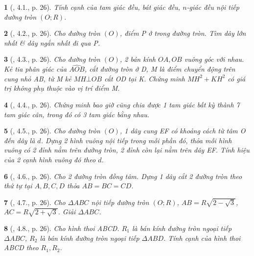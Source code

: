 \documentclass{article}
\newtheorem{baitoan}{}
\begin{document}
\begin{baitoan}[\cite{TLCT_THCS_Toan_9_hinh_hoc}, 4.1., p. 26]
	Tính cạnh của tam giác đều, bát giác đều, $n$-giác đều nội tiếp đường tròn $(O;R)$.
\end{baitoan}

\begin{baitoan}[\cite{TLCT_THCS_Toan_9_hinh_hoc}, 4.2., p. 26]
	Cho đường tròn $(O)$, điểm P ở trong đường tròn. Tìm dây lớn nhất \& dây ngắn nhất đi qua P.
\end{baitoan}

\begin{baitoan}[\cite{TLCT_THCS_Toan_9_hinh_hoc}, 4.3., p. 26]
	Cho đường tròn $(O)$, 2 bán kính $OA,OB$ vuông góc với nhau. Kẻ tia phân giác của $\widehat{AOB}$, cắt đường tròn ở D, M là điểm chuyển động trên cung nhỏ AB, từ M kẻ $MH\bot OB$ cắt OD tại K. Chứng minh $MH^2 + KH^2$ có giá trị không phụ thuộc vào vị trí điểm M.
\end{baitoan}

\begin{baitoan}[\cite{TLCT_THCS_Toan_9_hinh_hoc}, 4.4., p. 26]
	Chứng minh bao giờ cũng chia được 1 tam giác bất kỳ thành 7 tam giác cân, trong đó có 3 tam giác bằng nhau.
\end{baitoan}

\begin{baitoan}[\cite{TLCT_THCS_Toan_9_hinh_hoc}, 4.5., p. 26]
	Cho đường tròn $(O)$, 1 dây cung EF có khoảng cách từ tâm O đến dây là $d$. Dựng 2 hình vuông nội tiếp trong mỗi phần đó, thỏa mỗi hình vuông có 2 đỉnh nằm trên đường tròn, 2 đỉnh còn lại nằm trên dây EF. Tính hiệu của 2 cạnh hình vuông đó theo $d$.
\end{baitoan}

\begin{baitoan}[\cite{TLCT_THCS_Toan_9_hinh_hoc}, 4.6., p. 26]
	Cho 2 đường tròn đồng tâm. Dựng 1 dây cắt 2 đường tròn theo thứ tự tại $A,B,C,D$ thỏa $AB = BC = CD$.
\end{baitoan}

\begin{baitoan}[\cite{TLCT_THCS_Toan_9_hinh_hoc}, 4.7., p. 26]
	Cho $\Delta ABC$ nội tiếp đường tròn $(O;R)$, $AB = R\sqrt{2 - \sqrt{3}}$, $AC = R\sqrt{2 + \sqrt{3}}$. Giải $\Delta ABC$.
\end{baitoan}

\begin{baitoan}[\cite{TLCT_THCS_Toan_9_hinh_hoc}, 4.8., p. 26]
	Cho hình thoi ABCD. $R_1$ là bán kính đường tròn ngoại tiếp $\Delta ABC$, $R_2$ là bán kính đường tròn ngoại tiếp $\Delta ABD$. Tính cạnh của hình thoi ABCD theo $R_1,R_2$.
\end{baitoan}
\end{document}
